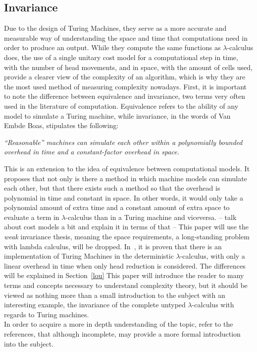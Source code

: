 \documentclass[12pt]{article}
\begin{document}
\subsection{Invariance}
Due to the design of Turing Machines, they serve as a more accurate and measurable way of understanding the space and time that computations need in order to produce an output. While they compute the same functions as $\lambda$-calculus does, the use of a single unitary cost model for a computational step in time, with the number of head movements, and in space, with the amount of cells used, provide a clearer view of the complexity of an algorithm, which is why they are the most used method of measuring complexity nowadays.
First, it is important to note the difference between equivalence and invariance, two terms very often used in the literature of computation. Equivalence refers to the ability of any model to simulate a Turing machine, while invariance, in the words of Van Embde Boas, stipulates the following:
\begin{center}
 \textit{\enquote{Reasonable} machines can simulate each other within a polynomially
bounded overhead in time and a constant-factor overhead in space.}
\end{center}
This is an extension to the idea of equivalence between computational models. It proposes that not only is there a method in which machine models can simulate each other, but that there exists such a method so that the overhead is polynomial in time and constant in space. In other words, it would only take a polynomial amount of extra time and a constant amount of extra space to evaluate a term in $\lambda$-calculus than in a Turing machine and viceversa. -- talk about cost models a bit  and explain it in terms of that --
This paper will use the \textit{weak} invariance thesis, meaning the space requirements, a long-standing problem with lambda calculus, will be dropped.
In~\cite{invariance-of-cost-model}, it is proven that there is an implementation of Turing Machines in the deterministic $\lambda$-calculus, with only a linear overhead in time when only head reduction is considered. The differences will be explained in Section~\ref{lou} This paper will introduce the reader to many terms and concepts necessary to understand complexity theory, but it should be viewed as nothing more than a small introduction to the subject with an interesting example, the invariance of the complete untyped $\lambda$-calculus with regards to Turing machines. \\
In order to acquire a more in depth understanding of the topic, refer to the references, that although incomplete, may provide a more formal introduction into the subject.
\end{document}
